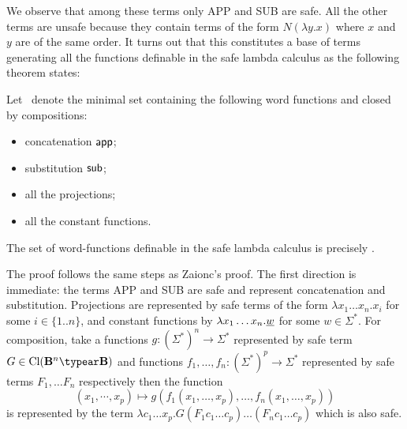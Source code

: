 We observe that among these terms only {\rm APP} and {\rm SUB} are
safe. All the other terms are unsafe because they contain terms of
the form $ N (\lambda y .x)$ where $x$ and $y$ are of the same
order. It turns out that this constitutes a base of terms generating
all the functions definable in the safe lambda calculus as the
following theorem states:
\begin{theorem}
\label{thm:wordfunctions_safely_definable}
Let \safedefset\ denote the minimal set containing the following word functions and closed by compositions:
\begin{itemize}
  \item concatenation ${\sf app}$;
  \item substitution ${\sf sub}$;
  \item all the projections;
  \item all the constant functions.
\end{itemize}
The set of word-functions definable in the safe lambda calculus is
precisely \safedefset.
\end{theorem}

The proof follows the same steps as Zaionc's proof. The first
direction is immediate: the terms {\rm APP} and {\rm SUB} are safe
and represent concatenation and substitution. Projections are
represented by safe terms of the form $\lambda x_1 \ldots x_n . x_i$
for some $i\in\{1..n\}$, and constant functions by $\lambda x_1
\ldots x_n . \underline{w}$ for some $w\in\Sigma^*$. For
composition, take a functions $g:(\Sigma^*)^n \rightarrow \Sigma^*$
represented by safe term $G\in \closedof{\zaiwordtyp^n \typear
\zaiwordtyp}$ and functions $f_1,\ldots,f_n : (\Sigma^*)^p
\rightarrow \Sigma^*$ represented by safe terms $F_1,\ldots F_n$
respectively then the function $$(x_1,\cdots,x_p) \mapsto
g(f_1(x_1,\ldots,x_p),\ldots,f_n(x_1,\ldots,x_p))$$ is represented
by the term $\lambda c_1\ldots x_p. G (F_1 c_1 \ldots c_p)\ldots
(F_n c_1 \ldots c_p)$ which is also safe.
\bigskip

